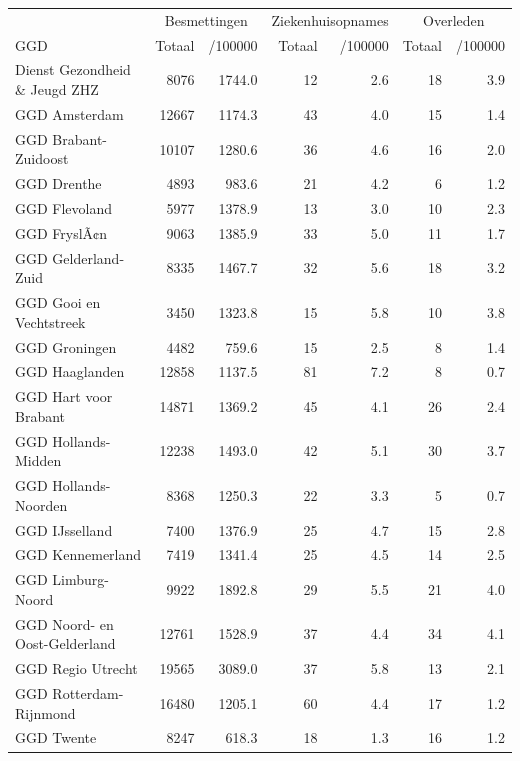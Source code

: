 \documentclass[
  english,
  man,floatsintext]{apa6}
\begin{document}
\begin{table}
\centering\begingroup\fontsize{10}{12}\selectfont

\begin{threeparttable}
\begin{tabular}{lrrrrrr}
\toprule
\multicolumn{1}{c}{ } & \multicolumn{2}{c}{Besmettingen} & \multicolumn{2}{c}{Ziekenhuisopnames} & \multicolumn{2}{c}{Overleden} \\
\cmidrule(l{3pt}r{3pt}){2-3} \cmidrule(l{3pt}r{3pt}){4-5} \cmidrule(l{3pt}r{3pt}){6-7}
GGD & Totaal & /100000 & Totaal & /100000 & Totaal & /100000\\
\midrule
Dienst Gezondheid \& Jeugd ZHZ & 8076 & 1744.0 & 12 & 2.6 & 18 & 3.9\\
GGD Amsterdam & 12667 & 1174.3 & 43 & 4.0 & 15 & 1.4\\
GGD Brabant-Zuidoost & 10107 & 1280.6 & 36 & 4.6 & 16 & 2.0\\
GGD Drenthe & 4893 & 983.6 & 21 & 4.2 & 6 & 1.2\\
GGD Flevoland & 5977 & 1378.9 & 13 & 3.0 & 10 & 2.3\\
GGD FryslÃ¢n & 9063 & 1385.9 & 33 & 5.0 & 11 & 1.7\\
GGD Gelderland-Zuid & 8335 & 1467.7 & 32 & 5.6 & 18 & 3.2\\
GGD Gooi en Vechtstreek & 3450 & 1323.8 & 15 & 5.8 & 10 & 3.8\\
GGD Groningen & 4482 & 759.6 & 15 & 2.5 & 8 & 1.4\\
GGD Haaglanden & 12858 & 1137.5 & 81 & 7.2 & 8 & 0.7\\
GGD Hart voor Brabant & 14871 & 1369.2 & 45 & 4.1 & 26 & 2.4\\
GGD Hollands-Midden & 12238 & 1493.0 & 42 & 5.1 & 30 & 3.7\\
GGD Hollands-Noorden & 8368 & 1250.3 & 22 & 3.3 & 5 & 0.7\\
GGD IJsselland & 7400 & 1376.9 & 25 & 4.7 & 15 & 2.8\\
GGD Kennemerland & 7419 & 1341.4 & 25 & 4.5 & 14 & 2.5\\
GGD Limburg-Noord & 9922 & 1892.8 & 29 & 5.5 & 21 & 4.0\\
GGD Noord- en Oost-Gelderland & 12761 & 1528.9 & 37 & 4.4 & 34 & 4.1\\
GGD Regio Utrecht & 19565 & 3089.0 & 37 & 5.8 & 13 & 2.1\\
GGD Rotterdam-Rijnmond & 16480 & 1205.1 & 60 & 4.4 & 17 & 1.2\\
GGD Twente & 8247 & 618.3 & 18 & 1.3 & 16 & 1.2\\

\end{tabular}
\end{threeparttable}
\end{table}
\end{document}
